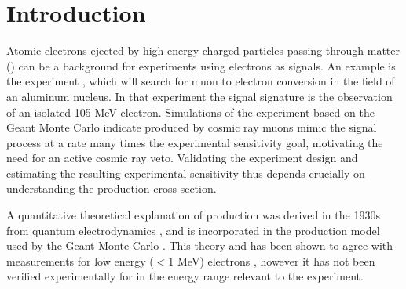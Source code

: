 \section{Introduction}
Atomic electrons ejected by high-energy charged particles passing through
matter (\deltarays) can be a background for experiments using electrons as
signals.  An example is the \mutoe experiment \cite{mutoe}, which will search for muon
to electron conversion in the field of an aluminum nucleus.  In that experiment
the signal signature is the observation of an isolated 105 MeV electron.
Simulations of the \mutoe experiment based on the Geant \cite{g4} Monte Carlo
indicate \deltarays produced by cosmic ray muons mimic the signal process
at a rate many times the experimental sensitivity goal, motivating
the need for an active cosmic ray veto.  Validating the \mutoe experiment design
and estimating the resulting experimental sensitivity thus depends crucially on
understanding the \deltaray production cross section.

A quantitative theoretical explanation of \deltaray production was derived in
the 1930s from quantum electrodynamics \cite{drtheory}, and is incorporated in the
\deltaray production model used by the Geant Monte Carlo \cite{g4}.  This theory
and has been shown to agree with measurements for low energy ($< 1$ MeV)
electrons \cite{drexpt}, however it has not been verified experimentally for
\deltarays in the energy range relevant to the \mutoe experiment.


